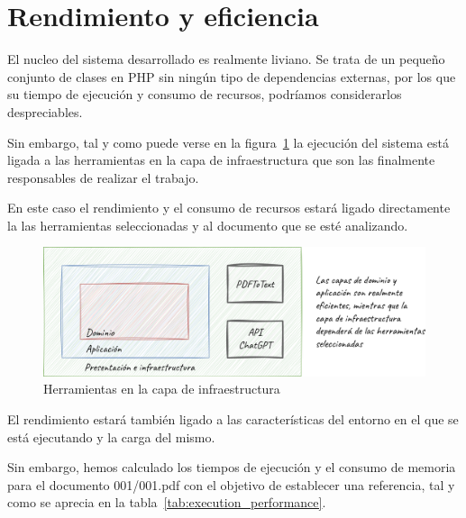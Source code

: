 \section{Rendimiento y eficiencia}

El nucleo del sistema desarrollado es realmente liviano.
Se trata de un pequeño conjunto de clases en PHP sin ningún tipo de dependencias externas, por los que su tiempo de
ejecución y consumo de recursos, podríamos considerarlos despreciables.

Sin embargo, tal y como puede verse en la figura~\ref{fig:chapter_5.2.performance}
la ejecución del sistema está ligada a las herramientas en la capa de infraestructura que son las finalmente
responsables de realizar el trabajo.

En este caso el rendimiento y el consumo de recursos estará ligado directamente la las herramientas seleccionadas y al
documento que se esté analizando.

\begin{figure}[ht]
    \begin{center}
        \includegraphics[width=\textwidth]{./chapter/5/images/chapter_5.2.performance}
        \caption{Herramientas en la capa de infraestructura}
        \label{fig:chapter_5.2.performance}
    \end{center}
\end{figure}



El rendimiento estará también ligado a las características del entorno en el que se está ejecutando y la carga del
mismo.

Sin embargo, hemos calculado los tiempos de ejecución y el consumo de memoria para el documento 001/001.pdf con el
objetivo de establecer una referencia, tal y como se aprecia en la tabla~\ref{tab:execution_performance}.

